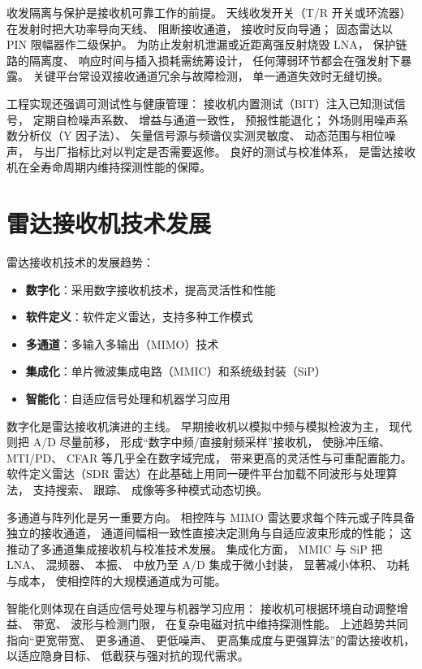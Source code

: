 收发隔离与保护是接收机可靠工作的前提。
天线收发开关（T/R 开关或环流器）在发射时把大功率导向天线、
阻断接收通道，
接收时反向导通；
固态雷达以 PIN 限幅器作二级保护。
为防止发射机泄漏或近距离强反射烧毁 LNA，
保护链路的隔离度、
响应时间与插入损耗需统筹设计，
任何薄弱环节都会在强发射下暴露。
关键平台常设双接收通道冗余与故障检测，
单一通道失效时无缝切换。

工程实现还强调可测试性与健康管理：
接收机内置测试（BIT）注入已知测试信号，
定期自检噪声系数、
增益与通道一致性，
预报性能退化；
外场则用噪声系数分析仪（Y 因子法）、
矢量信号源与频谱仪实测灵敏度、
动态范围与相位噪声，
与出厂指标比对以判定是否需要返修。
良好的测试与校准体系，
是雷达接收机在全寿命周期内维持探测性能的保障。

\section{雷达接收机技术发展}
\label{sec:radar_development}

雷达接收机技术的发展趋势：

\begin{itemize}
    \item \textbf{数字化}：采用数字接收机技术，提高灵活性和性能
    \item \textbf{软件定义}：软件定义雷达，支持多种工作模式
    \item \textbf{多通道}：多输入多输出（MIMO）技术
    \item \textbf{集成化}：单片微波集成电路（MMIC）和系统级封装（SiP）
    \item \textbf{智能化}：自适应信号处理和机器学习应用
\end{itemize}

数字化是雷达接收机演进的主线。
早期接收机以模拟中频与模拟检波为主，
现代则把 A/D 尽量前移，
形成“数字中频/直接射频采样”接收机，
使脉冲压缩、
MTI/PD、
CFAR 等几乎全在数字域完成，
带来更高的灵活性与可重配置能力。
软件定义雷达（SDR 雷达）在此基础上用同一硬件平台加载不同波形与处理算法，
支持搜索、
跟踪、
成像等多种模式动态切换。

多通道与阵列化是另一重要方向。
相控阵与 MIMO 雷达要求每个阵元或子阵具备独立的接收通道，
通道间幅相一致性直接决定测角与自适应波束形成的性能；
这推动了多通道集成接收机与校准技术发展。
集成化方面，
MMIC 与 SiP 把 LNA、
混频器、
本振、
中放乃至 A/D 集成于微小封装，
显著减小体积、
功耗与成本，
使相控阵的大规模通道成为可能。

智能化则体现在自适应信号处理与机器学习应用：
接收机可根据环境自动调整增益、
带宽、
波形与检测门限，
在复杂电磁对抗中维持探测性能。
上述趋势共同指向“更宽带宽、
更多通道、
更低噪声、
更高集成度与更强算法”的雷达接收机，
以适应隐身目标、
低截获与强对抗的现代需求。

